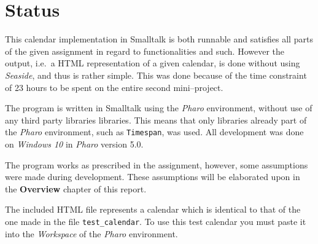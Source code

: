 \chapter{Status}

This calendar implementation in Smalltalk is both runnable and satisfies all parts of the given assignment in regard to functionalities and such.
However the output, i.e.~a HTML representation of a given calendar, is done without using \textit{Seaside}, and thus is rather simple.
This was done because of the time constraint of 23 hours to be spent on the entire second mini--project.

\medskip
The program is written in Smalltalk using the \textit{Pharo} environment, without use of any third party libraries libraries.
This means that only libraries already part of the \textit{Pharo} environment, such as \texttt{Timespan}, was used.
All development was done on \textit{Windows 10} in \textit{Pharo} version 5.0.

\medskip
The program works as prescribed in the assignment, however, some assumptions were made during development.
These assumptions will be elaborated upon in the \textbf{Overview} chapter of this report.

The included HTML file represents a calendar which is identical to that of the one made in the file \texttt{test\_calendar}.
To use this test calendar you must paste it into the \textit{Workspace} of the \textit{Pharo} environment.
